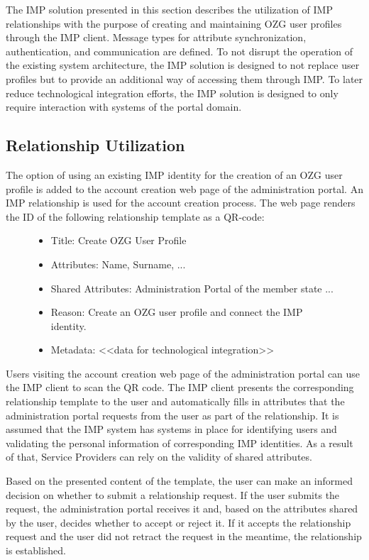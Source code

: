 The IMP solution presented in this section describes the utilization of IMP relationships with the purpose of creating and maintaining OZG user profiles through the IMP client. Message types for attribute synchronization, authentication, and communication are defined. To not disrupt the operation of the existing system architecture, the IMP solution is designed to not replace user profiles but to provide an additional way of accessing them through IMP. To later reduce technological integration efforts, the IMP solution is designed to only require interaction with systems of the portal domain.

\subsection{Relationship Utilization}
The option of using an existing IMP identity for the creation of an OZG user profile is added to the account creation web page of the administration portal. An IMP relationship is used for the account creation process. The web page renders the ID of the following relationship template as a QR-code: 

\begin{figure}[H]
\begin{itemize}
    \item Title: Create OZG User Profile
    \item Attributes: Name, Surname, ... 
    \item Shared Attributes: Administration Portal of the member state ...
    \item Reason: Create an OZG user profile and connect the IMP identity.
    \item Metadata: <<data for technological integration>>
\end{itemize}
\end{figure}

Users visiting the account creation web page of the administration portal can use the IMP client to scan the QR code. The IMP client presents the corresponding relationship template to the user and automatically fills in attributes that the administration portal requests from the user as part of the relationship. It is assumed that the IMP system has systems in place for identifying users and validating the personal information of corresponding IMP identities. As a result of that, Service Providers can rely on the validity of shared attributes.

Based on the presented content of the template, the user can make an informed decision on whether to submit a relationship request. If the user submits the request, the administration portal receives it and, based on the attributes shared by the user, decides whether to accept or reject it. If it accepts the relationship request and the user did not retract the request in the meantime, the relationship is established.

